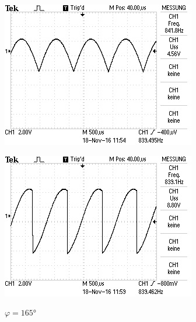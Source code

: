 \begin{figure}[!h]
\begin{minipage}[t]{0.3\textwidth}
\label{fig:2}
\caption{$\varphi = 45\si{\degree}$}
\end{minipage}
\hspace{10pt}
\vspace{5pt}
\begin{minipage}[t]{0.3\textwidth}
\includegraphics[width=\textwidth]{Bilder/105.jpg}
\label{fig:3}
\caption{$\varphi = 105\si{\degree}$}
\end{minipage}
\hspace{10pt}
\vspace{5pt}
\begin{minipage}[t]{0.3\textwidth}
\includegraphics[width=\textwidth]{Bilder/165.jpg}
\label{fig:4}
\caption{$\varphi = 165\si{\degree}$}
\end{minipage}

\end{figure}
